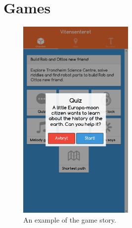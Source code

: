 \section{Games}

\begin{figure}[H]
    \centering
    \includegraphics[width=0.5\textwidth]{images/app/overview_start_game.png}
    \caption{An example of the game story.}
    \label{fig:overview_start_game}
\end{figure}

